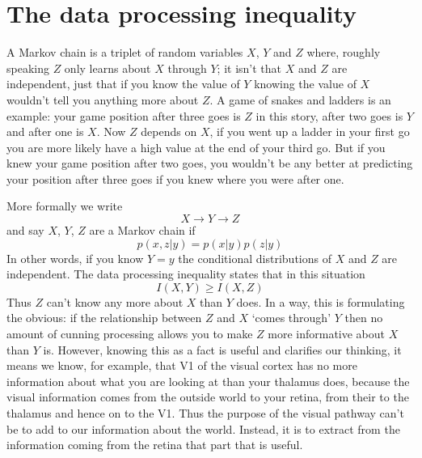 \documentclass[12pt]{article}
\begin{document}
\section*{The data processing inequality}

A Markov chain is a triplet of random variables $X$, $Y$ and $Z$
where, roughly speaking $Z$ only learns about $X$ through $Y$; it isn't
that $X$ and $Z$ are independent, just that if you know the value of
$Y$ knowing the value of $X$ wouldn't tell you anything more about $Z$. A game of
snakes and ladders is an example: your game position after three goes
is $Z$ in this story, after two goes is $Y$ and after one is $X$. Now
$Z$ depends on $X$, if you went up a ladder in your first go you are
more likely have a high value at the end of your third go. But if you
knew your game position after two goes, you wouldn't be any better at
predicting your position after three goes if you knew where you were
after one.

More formally we write
\begin{equation}
X\rightarrow Y \rightarrow Z
\end{equation}
and say $X$, $Y$, $Z$ are a Markov chain if
\begin{equation}
p(x,z|y)=p(x|y)p(z|y)
\end{equation}
In other words, if you know $Y=y$ the conditional distributions of $X$
and $Z$ are independent. The data processing inequality states that in
this situation
\begin{equation}
I(X,Y)\ge I(X,Z)
\end{equation}
Thus $Z$ can't know any more about $X$ than $Y$ does. In a way, this
is formulating the obvious: if the relationship between $Z$ and $X$
\lq{}comes through\rq{} $Y$ then no amount of cunning processing
allows you to make $Z$ more informative about $X$ than $Y$
is. However, knowing this as a fact is useful and clarifies our
thinking, it means we know, for example, that V1 of the visual cortex
has no more information about what you are looking at than your
thalamus does, because the visual information comes from the outside
world to your retina, from their to the thalamus and hence on to the
V1. Thus the purpose of the visual pathway can't be to add to our
information about the world. Instead, it is to extract from the
information coming from the retina that part that is useful.


{}
\end{document}
